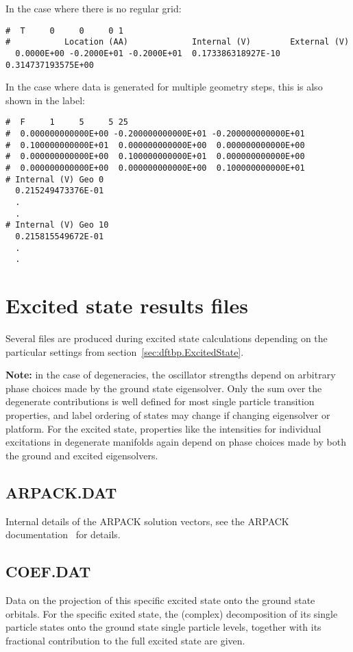 In the case where there is no regular grid:
\begin{verbatim}
#  T     0     0     0 1
#           Location (AA)             Internal (V)        External (V)
  0.0000E+00 -0.2000E+01 -0.2000E+01  0.173386318927E-10  0.314737193575E+00
\end{verbatim}

In the case where data is generated for multiple geometry steps, this is also
shown in the label:
\begin{verbatim}
#  F     1     5     5 25
#  0.000000000000E+00 -0.200000000000E+01 -0.200000000000E+01
#  0.100000000000E+01  0.000000000000E+00  0.000000000000E+00
#  0.000000000000E+00  0.100000000000E+01  0.000000000000E+00
#  0.000000000000E+00  0.000000000000E+00  0.100000000000E+01
# Internal (V) Geo 0
  0.215249473376E-01
  .
  .
# Internal (V) Geo 10
  0.215815549672E-01
  .
  .
\end{verbatim}

\section{Excited state results files}
\label{sec:tddftb_lr}
Several files are produced during excited state calculations depending on the
particular settings from section~\ref{sec:dftbp.ExcitedState}.

\textbf{Note:} in the case of degeneracies, the oscillator strengths depend on
arbitrary phase choices made by the ground state eigensolver. Only the sum over
the degenerate contributions is well defined for most single particle transition
properties, and label ordering of states may change if changing eigensolver or
platform. For the excited state, properties like the intensities for
individual excitations in degenerate manifolds again depend on phase choices
made by both the ground and excited eigensolvers.


\subsection{ARPACK.DAT}

Internal details of the ARPACK solution vectors, see the ARPACK
documentation~\cite{Lehoucq97arpackusers} for details.

\subsection{COEF.DAT}

Data on the projection of this specific excited state onto the ground state
orbitals. For the specific exited state, the (complex) decomposition of its
single particle states onto the ground state single particle levels, together
with its fractional contribution to the full excited state are given.

